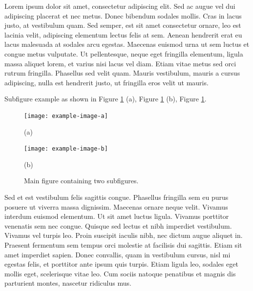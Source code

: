 Lorem ipsum dolor sit amet, consectetur adipiscing elit. Sed ac augue vel dui 
adipiscing placerat et nec metus. Donec bibendum sodales mollis. Cras in lacus 
justo, at vestibulum quam. Sed semper, est sit amet consectetur ornare, leo est 
lacinia velit, adipiscing elementum lectus felis at sem. Aenean hendrerit erat eu 
lacus malesuada at sodales arcu egestas. Maecenas euismod urna ut sem luctus et 
congue metus vulputate. Ut pellentesque, neque eget fringilla elementum, ligula 
massa aliquet lorem, et varius nisi lacus vel diam. Etiam vitae metus sed orci 
rutrum fringilla. Phasellus sed velit quam. Mauris vestibulum, mauris a cursus 
adipiscing, nulla est hendrerit justo, ut fringilla eros velit ut mauris.

Subfigure example as shown in Figure \ref{fig:ch2-2} (a), Figure \ref{fig:ch2-2} (b), Figure \ref{fig:ch2-2}.
\begin{figure}%
    \centering
    \begin{minipage}{60mm}%
            \texttt{[image: example-image-a]}
            \captionsetup{labelformat=empty} %
            \caption*{(a)} %
            \label{fig:ch2-2a}
    \end{minipage}%
    \qquad
    \begin{minipage}{60mm}%
            \texttt{[image: example-image-b]}
            \captionsetup{labelformat=empty} %
            \caption*{(b)} %
            \label{fig:ch2-2b}
    \end{minipage}%
    \caption{Main figure containing two subfigures.}
    \label{fig:ch2-2}
\end{figure}




Sed et est vestibulum felis sagittis congue. Phasellus fringilla sem eu purus 
posuere ut viverra massa dignissim. Maecenas ornare neque velit. Vivamus interdum 
euismod elementum. Ut sit amet luctus ligula. Vivamus porttitor venenatis sem nec 
congue. Quisque sed lectus et nibh imperdiet vestibulum. Vivamus vel turpis leo. 
Proin suscipit iaculis nibh, nec dictum augue aliquet in. Praesent fermentum sem 
tempus orci molestie at facilisis dui sagittis. Etiam sit amet imperdiet sapien. 
Donec convallis, quam in vestibulum cursus, nisl mi egestas felis, et porttitor 
ante ipsum quis turpis. Etiam ligula leo, sodales eget mollis eget, scelerisque 
vitae leo. Cum sociis natoque penatibus et magnis dis parturient montes, nascetur 
ridiculus mus. 


